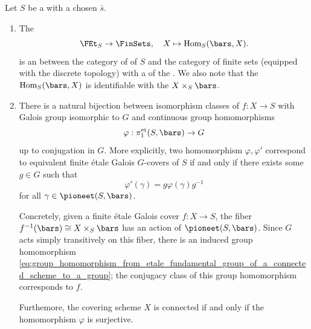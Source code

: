 \begin{theorem} \label{theorem:finite_etale_covers_of_a_connected_scheme_correspond_to_finite_sets_with_an_action_of_the_etale_fundamental_group}
Let $S$ be a   with a chosen  $\bar{s}$. 
\begin{enumerate}
    \item The 
    $$ \FEt_S \to \FinSets, \quad X \mapsto \mathrm{Hom}_S(\bars, X).$$
    is an  between the category of  of $S$ and the category of finite sets (equipped with the discrete topology) with a  of the .
    We also note that the  $\mathrm{Hom}_S(\bars, X)$ is identifiable with the  $X \times_S \bars$.

    \item There is a natural bijection between isomorphism classes of   $f : X \to S$ with Galois group isomorphic to $G$ and continuous group homomorphisms
    \begin{align}
    \varphi : \pi_1^{\mathrm{et}}(S, \bars) \to G \label{eq:group_homomorphism_from_etale_fundamental_group_of_a_connected_scheme_to_a_group}
    \end{align}
    up to conjugation in $G$. More explicitly, two homomorphism $\varphi, \varphi'$ correspond to equivalent finite \'etale Galois $G$-covers of $S$ if and only if there exists some $g \in G$ such that 
    $$\varphi'(\gamma) = g\varphi(\gamma) g^{-1}$$
    for all $\gamma \in \pioneet(S, \bars)$.

    Concretely, given a finite \'etale Galois cover $f: X \to S$, the fiber $f^{-1}(\bars) \cong X \times_S \bars$ has an action of $\pioneet(S, \bars)$. Since $G$ acts simply transitively on this fiber, there is an induced group homomorphism \eqref{eq:group_homomorphism_from_etale_fundamental_group_of_a_connected_scheme_to_a_group}; the conjugacy class of this group homomorphism corresponds to $f$.

    Furthemore, the covering scheme $X$ is connected if and only if the homomorphism $\varphi$ is surjective.
\end{enumerate}
\end{theorem}
